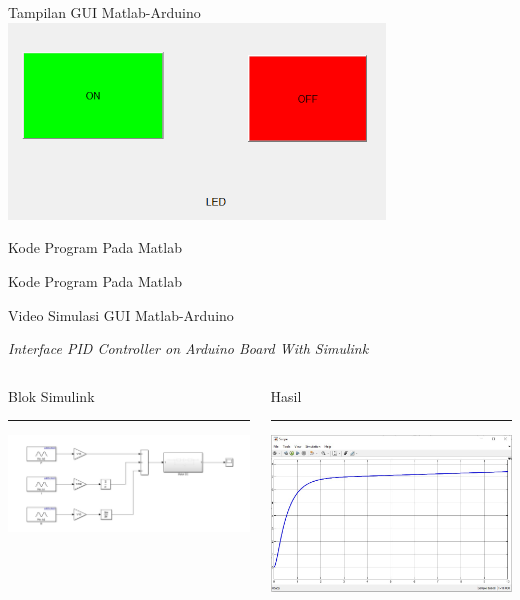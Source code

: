 \documentclass[10pt,xcolor={dvipsnames}]{beamer}
\begin{document}
\begin{frame}{Tampilan GUI Matlab-Arduino}
	\centering
	\includegraphics[width=10cm]{Hasil Matlab/GUI MAtlab arduino.png}
\end{frame}

\begin{frame}{Kode Program Pada Matlab}
	
\end{frame}

\begin{frame}{Kode Program Pada Matlab}
	
\end{frame}

\begin{frame}{Video Simulasi GUI Matlab-Arduino}
	\centering
\end{frame}

\begin{frame}{\textit{Interface PID Controller on Arduino Board With Simulink}}
	\begin{columns}[T] %
		\begin{column}{0.48\textwidth}
			Blok Simulink
			\color{black}\rule{\linewidth}{4pt}
			\includegraphics[width=7.5cm]{Gambar Lain/asimulink_pid.jpg}
		\end{column}%
		\hfill%
		\begin{column}{0.48\textwidth}
			Hasil
			\color{blue}\rule{\linewidth}{4pt}
			\begin{center}
				\includegraphics[width=7.5cm]{Hasil Matlab/scopesys.jpg}
			\end{center}
		\end{column}
	\end{columns}
\end{frame}
\end{document}
